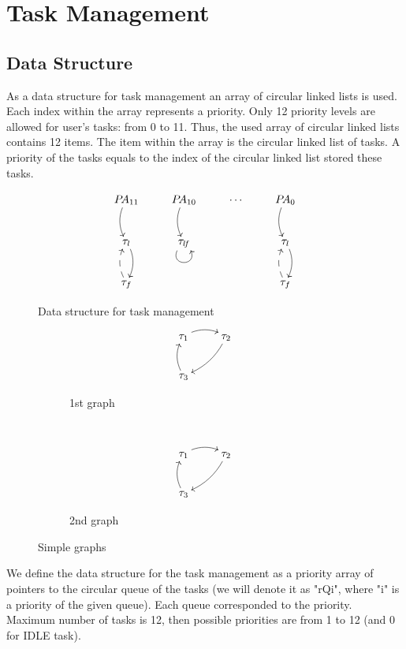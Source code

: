 \section{Task Management}
\subsection{Data Structure}

As a data structure for task management an array of circular linked
lists is used. Each index within the array represents a priority. Only
12 priority levels are allowed for user's tasks:  from 0 to 11. Thus,
the used array of circular linked lists contains 12 items. The item
within the array is the circular linked list of tasks. A priority of the
tasks equals to the index of the circular linked list stored these
tasks.

\begin{figure}[h]\centering\[\xymatrix{
	P\!A_{11} \ar@/_/[d] 
	& P\!A_{10} \ar@/_/[d] 
	& \cdots 
	& P\!A_{0} \ar@/_/[d] 
	\\
	\tau_{l} \ar@/^/[d] 
	& \tau_{l\!f} \ar@(dl,dr) 
	& 
	& \tau_{l} \ar@/^/[d]
	\\
	\tau_{f} \ar@/^/@{-->}[u] 
	& 
	& 
	& \tau_{f} \ar@/^/@{-->}[u]}\]
  \caption{Data structure for task management}\label{fig:tmds}
\end{figure}

\begin{figure}[h]
	\centering
	\begin{subfigure}[h]{0.3\textwidth}
		\[
		  	\xymatrix{
				\tau_1  \ar@/^/[r]
				&\tau_2 \ar@/^/[ld] \\
				\tau_3 \ar@/^/[u]}
		\]
		\caption{1st graph}\label{fig:1st_graph}
	\end{subfigure}
	~
	\begin{subfigure}[h]{0.3\textwidth}
		\[
			\xymatrix{
				\tau_1  \ar@/^/[r]
				&\tau_2 \ar@/^/[ld] \\
				\tau_3 \ar@/^/[u]}
		\]
		\caption{2nd graph}\label{fig:2nd_graph}
	\end{subfigure}
	\caption{Simple graphs}\label{fig:graphs}
\end{figure}


We define the data structure for the task management as a priority array
of pointers to the circular queue of the tasks (we will denote it as
"rQi", where "i" is a priority of the given queue). Each queue
corresponded to the priority. Maximum number of tasks is 12, then
possible priorities are from 1 to 12 (and 0 for IDLE task).

